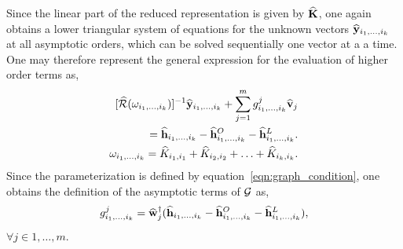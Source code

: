 Since the linear part of the reduced representation is given by $\mathbf{\widehat{K}}$, one again obtains a lower triangular system of equations for the unknown vectors $\widehat{\mathbf{y}}_{i_{1},\ldots,i_{k}}$ at all asymptotic orders, which can be solved sequentially one vector at a a time. One may therefore represent the general expression for the evaluation of higher order terms as,
\begin{subequations}
\label{eqn:graph_Ok_compact}
\begin{align}
	\begin{aligned}
		\ResolventHat{\omega_{i_{1},\ldots,i_{k}}}^{-1}\AsECenM_{i_{1},\ldots,i_{k}} + \sum^{m}_{j=1}\AsParamEl^{j}_{i_{1},\ldots,i_{k}}\EDevec_{j} \\
		= \AsEForcing_{i_{1},\ldots,i_{k}} - \AsEForcingO_{i_{1},\ldots,i_{k}} 
		- \AsEForcingL_{i_{1},\ldots,i_{k}}.
	\end{aligned} \\
	\omega_{i_{1},\ldots,i_{k}} = \widehat{K}_{i_{1},i_{1}} + \widehat{K}_{i_{2},i_{2}} + \ldots + \widehat{K}_{i_{k},i_{k}}.
\end{align}
\end{subequations}
Since the parameterization is defined by equation~\eqref{eqn:graph_condition}, one obtains the definition of the asymptotic terms of $\mathcal{G}$ as,
 \begin{equation}
 	\label{eqn:graph_gk_definition}
 		 g^{j}_{i_{1},\ldots,i_{k}} 
 		= \widehat{\mathbf{w}}^{\dagger}_{j}(\widehat{\mathbf{h}}_{i_{1},\ldots,i_{k}} - \widehat{\mathbf{h}}^{O}_{i_{1},\ldots,i_{k}} 
 		- \widehat{\mathbf{h}}^{L}_{i_{1},\ldots,i_{k}}),
 \end{equation}
$\forall j\in1,\ldots,m$. 

